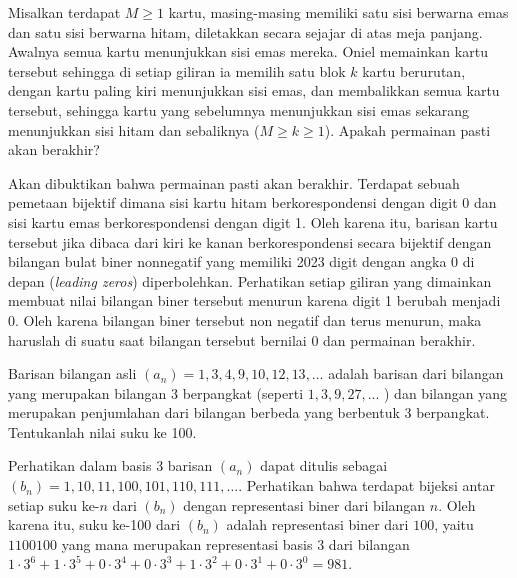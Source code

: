 \documentclass[12pt]{scrartcl}
\begin{document}
\begin{soaljawab}
Misalkan terdapat $M \ge 1$ kartu, masing-masing memiliki satu sisi berwarna emas dan satu sisi berwarna hitam, diletakkan secara sejajar di atas meja panjang. Awalnya semua kartu menunjukkan sisi emas mereka. Oniel memainkan kartu tersebut sehingga di setiap giliran ia memilih satu blok $k$ kartu berurutan, dengan kartu paling kiri menunjukkan sisi emas, dan membalikkan semua kartu tersebut, sehingga kartu yang sebelumnya menunjukkan sisi emas sekarang menunjukkan sisi hitam dan sebaliknya ($M \ge k \ge 1$). Apakah permainan pasti akan berakhir?
    \begin{solusi}
    Akan dibuktikan bahwa permainan pasti akan berakhir. Terdapat sebuah pemetaan bijektif dimana sisi kartu hitam berkorespondensi dengan digit 0 dan sisi kartu emas berkorespondensi dengan digit 1. Oleh karena itu, barisan kartu tersebut jika dibaca dari kiri ke kanan berkorespondensi secara bijektif dengan bilangan bulat biner nonnegatif yang memiliki 2023 digit dengan angka 0 di depan (\textit{leading zeros}) diperbolehkan. Perhatikan setiap giliran yang dimainkan membuat nilai bilangan biner tersebut menurun karena digit 1 berubah menjadi 0. Oleh karena bilangan biner tersebut non negatif dan terus menurun, maka haruslah di suatu saat bilangan tersebut bernilai 0 dan permainan berakhir.
    \end{solusi}
\end{soaljawab}

\begin{soaljawab}
Barisan bilangan asli $(a_n) = 1,3,4,9,10,12,13,\dots$ adalah barisan dari bilangan yang merupakan bilangan 3 berpangkat (seperti $1,3,9,27,...$ ) dan bilangan yang merupakan penjumlahan dari bilangan berbeda yang berbentuk 3 berpangkat. Tentukanlah nilai suku ke 100.
\begin{solusi}
    Perhatikan dalam basis 3 barisan $(a_n)$ dapat ditulis sebagai $(b_n) =1,10,11,100,101,110,111,\dots$. Perhatikan bahwa terdapat bijeksi antar setiap suku ke-$n$ dari $(b_n)$ dengan representasi biner dari bilangan $n$. Oleh karena itu, suku ke-100 dari $(b_n)$ adalah representasi biner dari $100$, yaitu $1100100$ yang mana merupakan representasi basis 3 dari bilangan $1\cdot3^6+1\cdot3^5+0\cdot3^4+0\cdot3^3+1\cdot3^2+0\cdot3^1+0\cdot3^0=\boxed{981}$.
\end{solusi}
\end{soaljawab}
\end{document}
